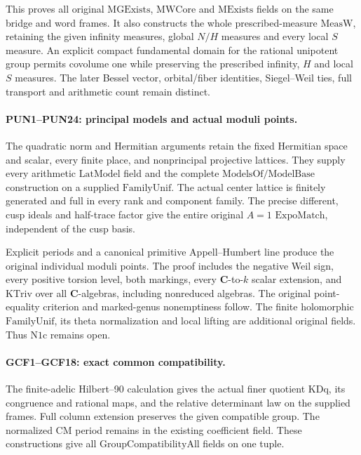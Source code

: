 \documentclass[11pt,a4paper]{article}
\numberwithin{equation}{section}
\theoremstyle{remark}\newtheorem{remark}[theorem]{Remark}
\begin{document}
This proves all original \(\mathrm{MGExists}\),
\(\mathrm{MWCore}\) and \(\mathrm{MExists}\) fields on the same
bridge and word frames. It also constructs the whole prescribed-measure
\(\mathrm{MeasW}\), retaining the given infinity measures, global
\(N/H\) measures and every local \(S\) measure. An explicit compact
fundamental domain for the rational unipotent group permits covolume
one while preserving the prescribed infinity, \(H\) and local
\(S\) measures. The later Bessel vector, orbital/fiber identities,
Siegel--Weil ties, full transport and arithmetic count remain distinct.

\paragraph{PUN1--PUN24: principal models and actual moduli points.}
The quadratic norm and Hermitian arguments retain the fixed
Hermitian space and scalar, every finite place, and nonprincipal
projective lattices. They supply every arithmetic \(\mathrm{LatModel}\)
field and the complete \(\mathrm{ModelsOf}/\mathrm{ModelBase}\)
construction on a supplied \(\mathrm{FamilyUnif}\).
The actual center lattice is finitely generated and full in every
rank and component family. The precise different, cusp ideals and
half-trace factor give the entire original \(A=1\)
\(\mathrm{ExpoMatch}\), independent of the cusp basis.

Explicit periods and a canonical primitive Appell--Humbert line
produce the original individual moduli points. The proof includes
the negative Weil sign, every positive torsion level, both markings,
every \(\mathbf C\)-to-\(k\) scalar extension, and
\(\mathrm{KTriv}\) over all \(\mathbf C\)-algebras, including
nonreduced algebras. The original point-equality criterion and
marked-genus nonemptiness follow. The finite holomorphic
\(\mathrm{FamilyUnif}\), its theta normalization and local lifting
are additional original fields. Thus \(\mathrm{N1c}\) remains open.

\paragraph{GCF1--GCF18: exact common compatibility.}
The finite-adelic Hilbert--90 calculation gives the actual finer
quotient \(\mathrm{KDq}\), its congruence and rational maps, and
the relative determinant law on the supplied frames. Full column
extension preserves the given compatible group. The normalized CM
period remains in the existing coefficient field. These constructions
give all \(\mathrm{GroupCompatibilityAll}\) fields on one tuple.
\end{document}
